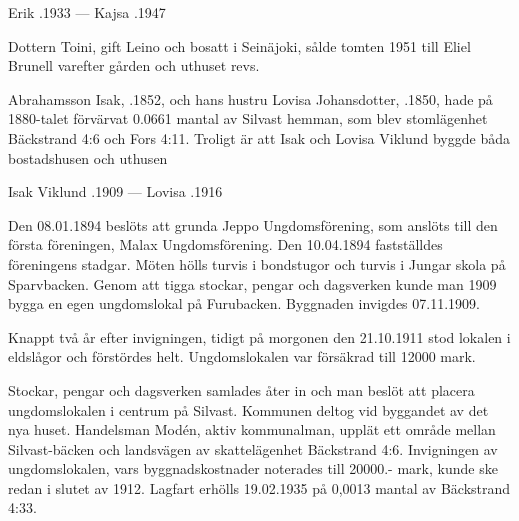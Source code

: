 Erik .1933  ---  Kajsa .1947

Dottern Toini, gift Leino och bosatt i Seinäjoki, sålde tomten 1951 till Eliel Brunell varefter gården och uthuset revs.


 Abrahamsson Isak, .1852, och hans hustru Lovisa Johansdotter, .1850, hade på 1880-talet förvärvat 0.0661 mantal av Silvast hemman, som blev stomlägenhet Bäckstrand 4:6 och Fors 4:11. Troligt är att Isak och Lovisa Viklund byggde båda bostadshusen och uthusen
\begin{jhchildren}
  \item {}
  \item {}
  \item {}
\end{jhchildren}

Isak Viklund .1909  ---  Lovisa .1916







Den 08.01.1894 beslöts att grunda Jeppo Ungdomsförening, som anslöts till den första föreningen, Malax Ungdomsförening. Den 10.04.1894 fastställdes föreningens stadgar. Möten hölls turvis i bondstugor och turvis i Jungar skola på Sparvbacken. Genom att tigga stockar, pengar och dagsverken kunde man 1909 bygga en egen ungdomslokal på Furubacken. Byggnaden invigdes 07.11.1909.


Knappt två år efter invigningen, tidigt på morgonen den 21.10.1911 stod lokalen i eldslågor och förstördes helt. Ungdomslokalen var försäkrad till 12000 mark.

Stockar, pengar och dagsverken samlades åter in och man beslöt att placera ungdomslokalen i centrum på Silvast. Kommunen deltog vid byggandet av det nya huset. Handelsman Modén, aktiv kommunalman, upplät ett område mellan Silvast-bäcken och landsvägen av skattelägenhet Bäckstrand 4:6. Invigningen av ungdomslokalen, vars byggnadskostnader noterades till 20000.- mark, kunde ske redan i slutet av 1912. Lagfart erhölls 19.02.1935 på 0,0013 mantal av Bäckstrand 4:33.

